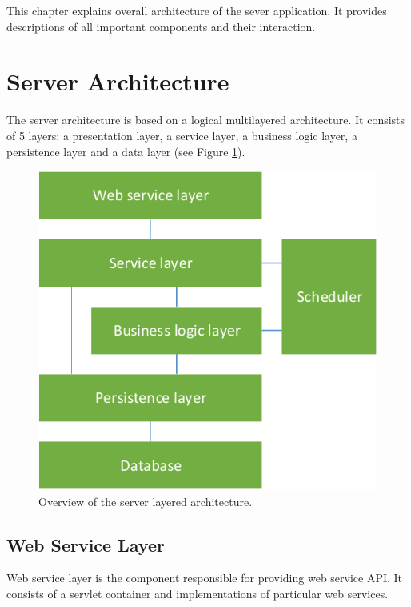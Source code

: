 
This chapter explains overall architecture of the \textan{} sever application. It
provides descriptions of all important components and their interaction.

\section{Server Architecture}

The server architecture is based on a logical multilayered architecture. It
consists of 5 layers: a presentation layer, a service layer, a business logic
layer, a persistence layer and a data layer (see Figure
\ref{fig:ServerComponentOverview}).

\begin{figure}[!htb]
        \centering
        \includegraphics{Images/ServerComponentOverview}
        \caption{Overview of the server layered architecture.}
        \label{fig:ServerComponentOverview}
\end{figure}

\subsection{Web Service Layer}

Web service layer is the component responsible for providing web service
API. It consists of a servlet container and implementations of particular
web services.

